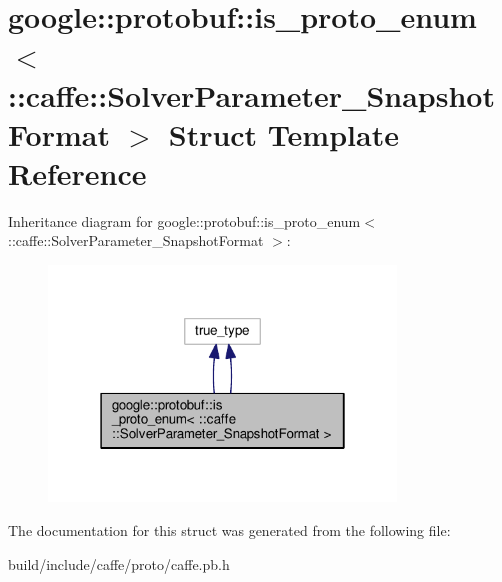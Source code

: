 \hypertarget{structgoogle_1_1protobuf_1_1is__proto__enum_3_01_1_1caffe_1_1_solver_parameter___snapshot_format_01_4}{}\section{google\+:\+:protobuf\+:\+:is\+\_\+proto\+\_\+enum$<$ \+:\+:caffe\+:\+:Solver\+Parameter\+\_\+\+Snapshot\+Format $>$ Struct Template Reference}
\label{structgoogle_1_1protobuf_1_1is__proto__enum_3_01_1_1caffe_1_1_solver_parameter___snapshot_format_01_4}


Inheritance diagram for google\+:\+:protobuf\+:\+:is\+\_\+proto\+\_\+enum$<$ \+:\+:caffe\+:\+:Solver\+Parameter\+\_\+\+Snapshot\+Format $>$\+:
\nopagebreak
\begin{figure}[H]
\begin{center}
\leavevmode
\includegraphics[width=262pt]{structgoogle_1_1protobuf_1_1is__proto__enum_3_01_1_1caffe_1_1_solver_parameter___snapshot_format_01_4__inherit__graph}
\end{center}
\end{figure}


The documentation for this struct was generated from the following file\+:\begin{DoxyCompactItemize}
\item 
build/include/caffe/proto/caffe.\+pb.\+h\end{DoxyCompactItemize}
